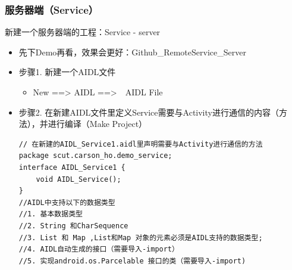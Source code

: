\documentclass[9pt, b5paper]{article}
\begin{document}
\subsubsection{服务器端（Service）}
\label{sec-5-6-1}

新建一个服务器端的工程：Service - server
\begin{itemize}
\item 先下Demo再看，效果会更好：Github\_RemoteService\_Server
\item 步骤1. 新建一个AIDL文件
\begin{itemize}
\item New ==> AIDL ==>　AIDL File
\end{itemize}
\item 步骤2. 在新建AIDL文件里定义Service需要与Activity进行通信的内容（方法），并进行编译（Make Project）
\begin{verbatim}
// 在新建的AIDL_Service1.aidl里声明需要与Activity进行通信的方法
package scut.carson_ho.demo_service;
interface AIDL_Service1 {
    void AIDL_Service();
}
//AIDL中支持以下的数据类型
//1. 基本数据类型
//2. String 和CharSequence
//3. List 和 Map ,List和Map 对象的元素必须是AIDL支持的数据类型;
//4. AIDL自动生成的接口（需要导入-import）
//5. 实现android.os.Parcelable 接口的类（需要导入-import)
\end{verbatim}
\end{itemize}
\end{document}
